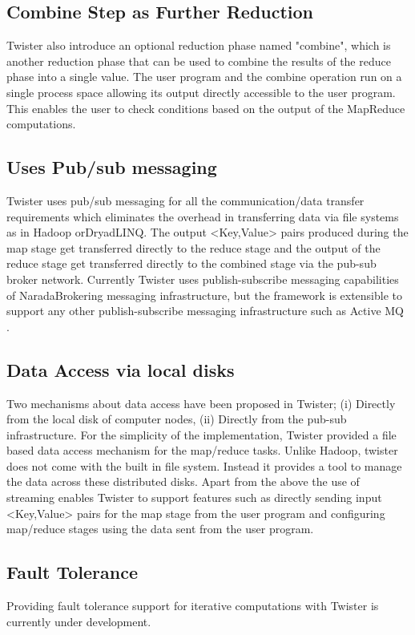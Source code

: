 \documentclass[9pt,twocolumn,twoside]{styles/osajnl}
\begin{document}
\subsection{Combine Step as Further Reduction}
Twister also introduce an optional reduction phase named "combine",
which is another reduction phase that can be used to combine the
results of the reduce phase into a single value. The user program and
the combine operation run on a single process space allowing its
output directly accessible to the user
program\cite{grolinger2014challenges}. This enables the user to check
conditions based on the output of the MapReduce
computations\cite{twister}.

\subsection{Uses Pub/sub messaging}
Twister uses pub/sub messaging for all the communication/data transfer
requirements which eliminates the overhead in transferring data via
file systems as in Hadoop orDryadLINQ\cite{grolinger2014challenges}. The output <Key,Value> pairs
produced during the map stage get transferred directly to the reduce
stage and the output of the reduce stage get transferred directly to
the combined stage via the pub-sub broker
network\cite{lee2012parallel}. Currently Twister uses
publish-subscribe messaging capabilities of NaradaBrokering messaging
infrastructure, but the framework is extensible to support any other
publish-subscribe messaging infrastructure such as Active MQ
\cite{twister}.

\subsection{Data Access via local disks}
Two mechanisms about data access have been proposed in Twister; (i)
Directly from the local disk of computer nodes, (ii) Directly from the
pub-sub infrastructure\cite{elsayed2014mapreduce}. For the simplicity
of the implementation, Twister provided a file based data access
mechanism for the map/reduce tasks. Unlike Hadoop, twister does not
come with the built in file system. Instead it provides a tool to
manage the data across these distributed disks.  Apart from the above
the use of streaming enables Twister to support features such as
directly sending input <Key,Value> pairs for the map stage from the
user program and configuring map/reduce stages using the data sent
from the user program\cite{mohammed2014applications}.

\subsection{Fault Tolerance}
Providing fault tolerance support for iterative computations with
Twister is currently under development.
\end{document}

